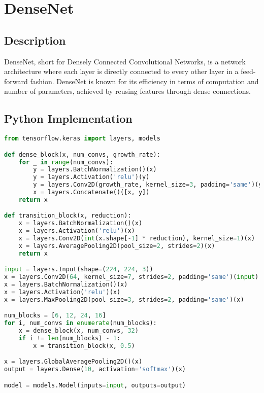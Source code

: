 \chapter{DenseNet}

\section{Description}
DenseNet, short for Densely Connected Convolutional Networks, is a network architecture where each layer is directly connected to every other layer in a feed-forward fashion. DenseNet is known for its efficiency in terms of computation and number of parameters, achieved by reusing features through dense connections.

\section{Python Implementation}
\begin{lstlisting}[language=Python]
from tensorflow.keras import layers, models

def dense_block(x, num_convs, growth_rate):
    for _ in range(num_convs):
        y = layers.BatchNormalization()(x)
        y = layers.Activation('relu')(y)
        y = layers.Conv2D(growth_rate, kernel_size=3, padding='same')(y)
        x = layers.Concatenate()([x, y])
    return x

def transition_block(x, reduction):
    x = layers.BatchNormalization()(x)
    x = layers.Activation('relu')(x)
    x = layers.Conv2D(int(x.shape[-1] * reduction), kernel_size=1)(x)
    x = layers.AveragePooling2D(pool_size=2, strides=2)(x)
    return x

input = layers.Input(shape=(224, 224, 3))
x = layers.Conv2D(64, kernel_size=7, strides=2, padding='same')(input)
x = layers.BatchNormalization()(x)
x = layers.Activation('relu')(x)
x = layers.MaxPooling2D(pool_size=3, strides=2, padding='same')(x)

num_blocks = [6, 12, 24, 16]
for i, num_convs in enumerate(num_blocks):
    x = dense_block(x, num_convs, 32)
    if i != len(num_blocks) - 1:
        x = transition_block(x, 0.5)

x = layers.GlobalAveragePooling2D()(x)
output = layers.Dense(10, activation='softmax')(x)

model = models.Model(inputs=input, outputs=output)
\end{lstlisting}

